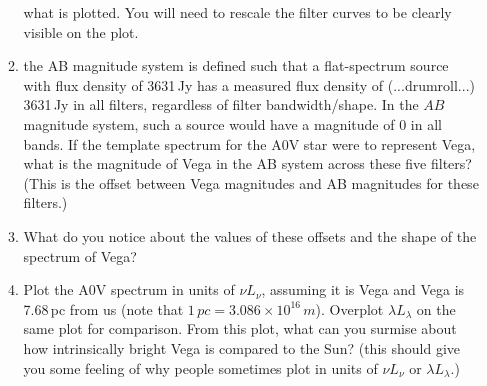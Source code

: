 \documentclass[11pt]{article}
\begin{document}
\begin{enumerate}
\begin{enumerate}
      what is plotted.  You will need to rescale the filter curves to
      be clearly visible on the plot.
    \item the AB magnitude system is defined such that a flat-spectrum
      source with flux density of 3631\,Jy has a measured flux density
      of (...drumroll...) 3631\,Jy in all filters, regardless of filter
      bandwidth/shape.  In the $AB$ magnitude system, such a source
      would have a magnitude of 0 in all bands.  If the template
      spectrum for the A0V star were to represent Vega, what is the
      magnitude of Vega in the AB system across these five filters?
      (This is the offset between Vega magnitudes and AB magnitudes
      for these filters.)
      \item What do you notice about the values of these offsets and
        the shape of the spectrum of Vega?
      \item Plot the A0V spectrum in units of $\nu\!L_{\nu}$, assuming
        it is Vega and Vega is 7.68\,pc from us (note that
        $1\,pc=3.086\times10^{16}\,m$).  Overplot
        $\lambda\!L_{\lambda}$ on the same plot for comparison.  From
        this plot, what can you surmise about how intrinsically bright
        Vega is compared to the Sun? (this should give you some
        feeling of why people sometimes plot in units of
        $\nu\!L_{\nu}$ or $\lambda\!L_\lambda$.)
  \end{enumerate}



\end{enumerate}
\end{document}
